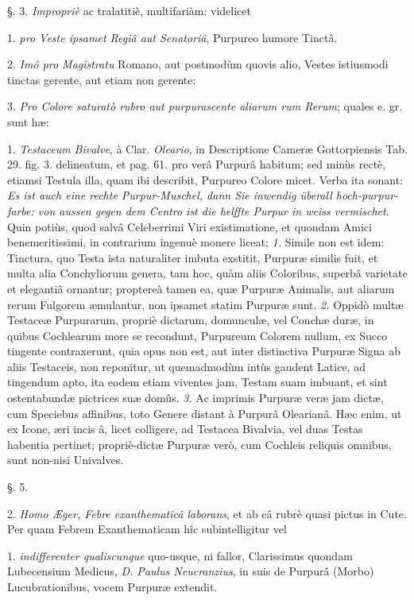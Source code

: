 \documentclass[a4paper, 11pt, oneside, polutonikogreek, german]{article}
\begin{document}
§. 3. \emph{Impropriè} ac tralatitiè, multifariàm: videlicet

1. \emph{pro Veste ipsamet Regiâ aut Senatoriâ}, Purpureo humore Tinctâ.

2. \emph{Imô pro Magistratu} Romano, aut postmodùm quovis alio, Vestes istiusmodi tinctas gerente, aut etiam non gerente:

3. \emph{Pro Colore saturatò rubro aut purpurascente aliarum rum Rerum}; quales e. gr. sunt hæ:

1. \emph{Testaceum Bivalve}, à Clar. \emph{Oleario}, in Descriptione Cameræ Gottorpiensis Tab. 29. fig. 3. delineatum, et pag. 61. pro verâ Purpurâ habitum; sed minùs rectè, etiamsi Testula illa, quam ibi describit, Purpureo Colore micet. Verba ita sonant: \emph{Es ist auch eine rechte Purpur-Muschel, dann Sie inwendig überall hoch-purpur-farbe: von aussen gegen dem Centro ist die helffte Purpur in weiss vermischet}. Quin potiùs, quod salvâ Celeberrimi Viri existimatione, et quondam Amici benemeritissimi, in contrarium ingenuè monere liceat; \emph{1.} Simile non est idem: Tinctura, quo Testa ista naturaliter imbuta exstitit, Purpuræ similis fuit, et multa alia Conchyliorum genera, tam hoc, quàm aliis Coloribus, superbâ varietate et elegantiâ ornantur; proptereà tamen ea, quæ Purpuræ Animalis, aut aliarum rerum Fulgorem æmulantur, non ipsamet statim Purpuræ sunt. \emph{2.} Oppidò multæ Testaceæ Purpurarum, propriè dictarum, domunculæ, vel Conchæ duræ, in quibus Cochlearum more se recondunt, Purpureum Colorem nullum, ex Succo tingente contraxerunt, quia opus non est, aut inter distinctiva Purpuræ Signa ab aliis Testaceis, non reponitur, ut quemadmodùm intùs gaudent Latice, ad tingendum apto, ita eodem etiam viventes jam, Testam suam imbuant, et sint ostentabundæ pictrices suæ domûs. \emph{3.} Ac imprimis Purpuræ veræ jam dictæ, cum Speciebus affinibus, toto Genere distant à Purpurâ Olearianâ. Hæc enim, ut ex Icone, æri incis â, licet colligere, ad Testacea Bivalvia, vel duas Testas habentia pertinet; propriè-dictæ Purpuræ verò, cum Cochleis reliquis omnibus, sunt non-nisi Univalves.

§. 5.

2. \emph{Homo Æger, Febre exanthematicâ laborans}, et ab eâ rubrè quasi pictus in Cute. Per quam Febrem Exanthematicam hîc subintelligitur vel

1. \emph{indifferenter qualiscunque} quo-usque, ni fallor, Clarissimus quondam Lubecensium Medicus, \emph{D. Paulus Neucranzius}, in suis de Purpurâ (Morbo) Lucubrationibus, vocem Purpuræ extendit.
\end{document}
